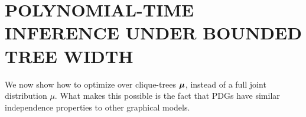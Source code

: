 \documentclass[twoside]{article}
\begin{document}




\section{POLYNOMIAL-TIME INFERENCE UNDER BOUNDED TREE WIDTH}
    \label{sec:clique-tree-expcone}

We now show how to optimize over clique-trees $\boldsymbol\mu$, instead of a full joint distribution $\mu$. What makes this possible is the fact that PDGs have similar independence properties to other graphical models. 
\end{document}
